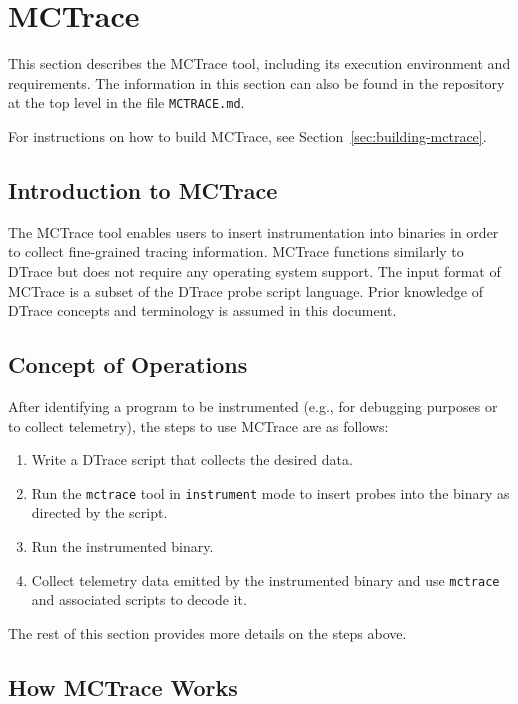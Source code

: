 
\section{MCTrace}
\label{sec:mctrace}

This section describes the MCTrace tool, including its execution
environment and requirements. The information in this section
can also be found in the repository at the top level in the file
\texttt{MCTRACE.md}.

For instructions on how to build MCTrace, see
Section~\ref{sec:building-mctrace}. 

\subsection{Introduction to MCTrace}
\label{sec:introduction-mctrace}

The MCTrace tool enables users to insert instrumentation into binaries
in order to collect fine-grained tracing information. MCTrace functions
similarly to DTrace but does not require any operating system support.
The input format of MCTrace is a subset of the DTrace probe script
language. Prior knowledge of DTrace concepts and terminology is assumed
in this document.

\subsection{Concept of Operations}
\label{sec:concept-operations}

After identifying a program to be instrumented (e.g., for debugging
purposes or to collect telemetry), the steps to use MCTrace are as
follows:
\begin{enumerate}
\item  Write a DTrace script that collects the desired data. 
\item Run the \texttt{mctrace} tool in \texttt{instrument} mode to insert probes into the
   binary as directed by the script.
\item  Run the instrumented binary.
\item Collect telemetry data emitted by the instrumented binary and use
   \texttt{mctrace} and associated scripts to decode it.
\end{enumerate}

The rest of this section provides more details on the steps above.

\subsection{How MCTrace Works}
\label{sec:how-mctrace-works}

